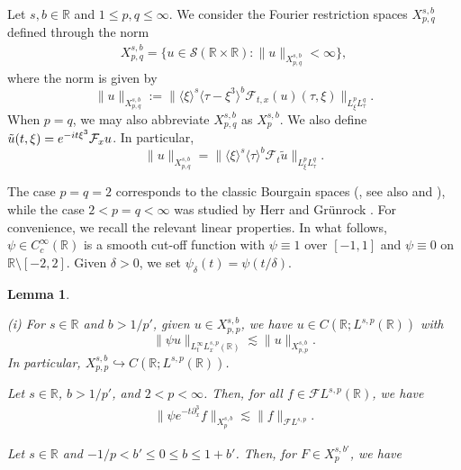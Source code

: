 \documentclass[%
11pt,  reqno]{amsart}
\newcommand{\jap}[1]{\langle #1 \rangle}
\newcommand{\5}{\textup{V}}
\newcommand{\noi}{\noindent}
\newcommand{\FL}{\mathcal{F} L}
\newcommand{\les}{\lesssim}
\newcommand{\F}{\mathcal{F}}
\newcommand{\dx}{\partial_x}
\newtheorem{lemma}[theorem]{Lemma}
\theoremstyle{remark}
\newcommand{\R}{\mathbb{R}}
\numberwithin{equation}{section}
\numberwithin{theorem}{section}
\begin{document}
	{
	
		
		
		Let $s,b\in \R$ and $1\le p,q \le \infty$. We consider the Fourier restriction spaces $X^{s,b}_{p,q}$ defined through the norm
		\begin{align}\label{defi:bourg_space}
			X^{s,b}_{p,q} =\{ u\in \mathcal{S}(\R\times \R) : \|u\|_{X^{s,b}_{p,q}}<\infty\},
		\end{align}
		where the norm is given by
		\begin{equation}
			\| u \|_{X^{s,b}_{p,q}} := \| \jap{\xi}^s \jap{\tau-\xi^3}^b \F_{t,x}(u) (\tau, \xi) \|_{L^p_\xi L^q_\tau}.
		\end{equation}
When $p=q$, we may also abbreviate $X^{s,b}_{p,q}$ as $X^{s,b}_p$.
		We also define $\Tilde{u}(t,\xi)=e^{-it\xi^3}\mathcal{F}_xu$. In particular,
		$$
		\|u\|_{X^{s,b}_{p,q}} = \|\jap{\xi}^s\jap{\tau}^b\mathcal{F}_t\tilde{u}\|_{L^p_\xi L^q_\tau}.
		$$
		
		The case $p=q=2$ corresponds to the classic Bourgain spaces (\cite{bourg1, bourg2}, see also \cite[Chapter 2.6]{tao_book} and \cite[Chapter 7.4]{linares_ponce_book}), while the case $2<p=q<\infty$ was studied by Herr and Grünrock \cite{herrgrunrock_fl}. For convenience, we recall the relevant linear properties. In what follows, $\psi\in C_c^\infty(\R)$ is a smooth cut-off function with $\psi\equiv 1$ over $[-1,1]$ and $\psi\equiv 0$ on $\R\setminus [-2,2]$. Given $\delta>0$, we set $\psi_\delta(t)=\psi(t/\delta)$.
		
		\begin{lemma}\label{lem:linear_estimates_qfinite}
			
			
			{\rm(i)} For $s\in\R$ and $b>1/p'$,  given $u\in X^{s,b}_{p,p}$, we have $u\in C(\R;L^{s,p}(\R))$ with
			\begin{equation}\label{lin_gh}
				\|\psi u\|_{L^\infty_tL_x^{s,p}(\R)}\lesssim \|u\|_{X^{s,b}_{p,p}}.
			\end{equation}
			In particular, $X^{s,b}_{p,p} \hookrightarrow C(\R;L^{s,p}(\R))$.
			
			\smallskip
			
			
			\noi {\rm(ii)} Let $s\in\R$, $b>1/p'$, and $2<p<\infty$. Then, for all $f \in \FL^{s,p}(\R)$, we have
			\begin{align}
				\label{lin1_gh}
				\| \psi e^{-t\dx^3} f \|_{X^{s,b}_{p}} \les \| f \|_{\FL^{s,p}}.
			\end{align}
			
			
			
			\noi{\rm(iii)} Let $s\in\R$ and $-1/p<b' \le 0 \le b \le 1+b'$. Then, for $F\in X^{s,b'}_{p}$, we have
			

\end{lemma}}
\end{document}
